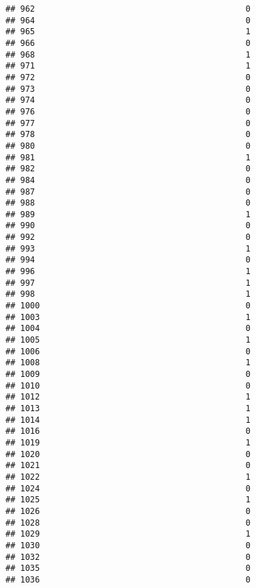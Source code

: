 \documentclass[
]{article}
\begin{document}
\begin{verbatim}
## 962                                           0
## 964                                           0
## 965                                           1
## 966                                           0
## 968                                           1
## 971                                           1
## 972                                           0
## 973                                           0
## 974                                           0
## 976                                           0
## 977                                           0
## 978                                           0
## 980                                           0
## 981                                           1
## 982                                           0
## 984                                           0
## 987                                           0
## 988                                           0
## 989                                           1
## 990                                           0
## 992                                           0
## 993                                           1
## 994                                           0
## 996                                           1
## 997                                           1
## 998                                           1
## 1000                                          0
## 1003                                          1
## 1004                                          0
## 1005                                          1
## 1006                                          0
## 1008                                          1
## 1009                                          0
## 1010                                          0
## 1012                                          1
## 1013                                          1
## 1014                                          1
## 1016                                          0
## 1019                                          1
## 1020                                          0
## 1021                                          0
## 1022                                          1
## 1024                                          0
## 1025                                          1
## 1026                                          0
## 1028                                          0
## 1029                                          1
## 1030                                          0
## 1032                                          0
## 1035                                          0
## 1036                                          0

\end{verbatim}
\end{document}
